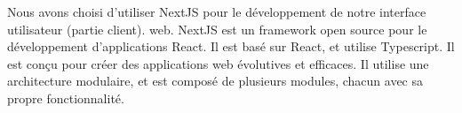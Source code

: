 Nous avons choisi d'utiliser NextJS pour le développement de notre interface utilisateur (partie client).
web. NextJS est un framework open source pour le développement d'applications
React. Il est basé sur React, et utilise Typescript. Il est conçu pour créer
des applications web évolutives et efficaces. Il utilise une architecture
modulaire, et est composé de plusieurs modules, chacun avec sa propre
fonctionnalité.
